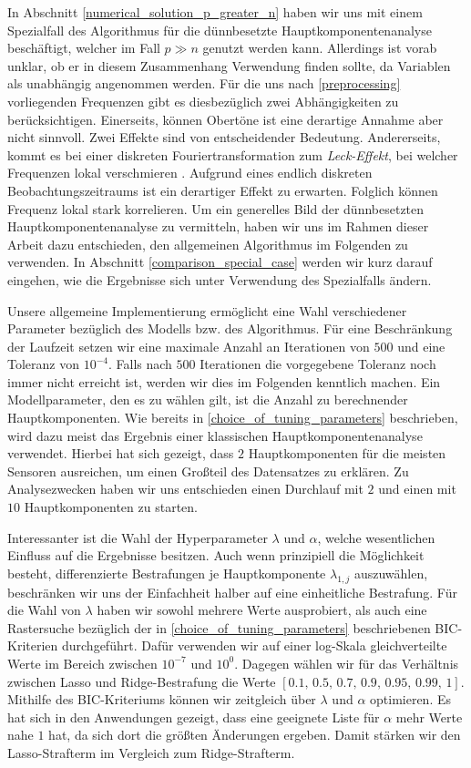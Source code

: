 In Abschnitt \ref{numerical_solution_p_greater_n} haben wir uns mit einem Spezialfall des Algorithmus für die dünnbesetzte Hauptkomponentenanalyse beschäftigt, welcher im Fall $p \gg n$ genutzt werden kann. Allerdings ist vorab unklar, ob er in diesem Zusammenhang Verwendung finden sollte, da Variablen als unabhängig angenommen werden. Für die uns nach \ref{preprocessing} vorliegenden Frequenzen gibt es diesbezüglich zwei Abhängigkeiten zu berücksichtigen. Einerseits, können Obertöne
ist eine derartige Annahme aber nicht sinnvoll. Zwei Effekte sind von entscheidender Bedeutung. Andererseits, kommt es bei einer diskreten Fouriertransformation zum \textit{Leck-Effekt}, bei welcher Frequenzen lokal verschmieren \cite{kiencke}. Aufgrund eines endlich diskreten Beobachtungszeitraums ist ein derartiger Effekt zu erwarten. Folglich können Frequenz lokal stark korrelieren. Um ein generelles Bild der dünnbesetzten Hauptkomponentenanalyse zu vermitteln, haben wir uns im Rahmen dieser Arbeit dazu entschieden, den allgemeinen Algorithmus im Folgenden zu verwenden. In Abschnitt \ref{comparison_special_case} werden wir kurz darauf eingehen, wie die Ergebnisse sich unter Verwendung des Spezialfalls ändern.

Unsere allgemeine Implementierung ermöglicht eine Wahl verschiedener Parameter bezüglich des Modells bzw. des Algorithmus. Für eine Beschränkung der Laufzeit setzen wir eine maximale Anzahl an Iterationen von $500$ und eine Toleranz von $10^{-4}$. Falls nach $500$ Iterationen die vorgegebene Toleranz noch immer nicht erreicht ist, werden wir dies im Folgenden kenntlich machen. Ein Modellparameter, den es zu wählen gilt, ist die Anzahl zu berechnender Hauptkomponenten. Wie bereits in \ref{choice_of_tuning_parameters} beschrieben, wird dazu meist das Ergebnis einer klassischen Hauptkomponentenanalyse verwendet. Hierbei hat sich gezeigt, dass $2$ Hauptkomponenten für die meisten Sensoren ausreichen, um einen Großteil des Datensatzes zu erklären. Zu Analysezwecken haben wir uns entschieden einen Durchlauf mit $2$ und einen mit $10$ Hauptkomponenten zu starten. 

Interessanter ist die Wahl der Hyperparameter $\lambda$ und $\alpha$, welche wesentlichen Einfluss auf die Ergebnisse besitzen. Auch wenn prinzipiell die Möglichkeit besteht, differenzierte Bestrafungen je Hauptkomponente $\lambda_{1,j}$ auszuwählen, beschränken wir uns der Einfachheit halber auf eine einheitliche Bestrafung. Für die Wahl von $\lambda$ haben wir sowohl mehrere Werte ausprobiert, als auch eine Rastersuche bezüglich der in \ref{choice_of_tuning_parameters} beschriebenen BIC-Kriterien durchgeführt. Dafür verwenden wir auf einer log-Skala gleichverteilte Werte im Bereich zwischen $10^{-7}$ und $10^0$. Dagegen wählen wir für das Verhältnis zwischen Lasso und Ridge-Bestrafung die Werte $[0.1,\, 0.5,\, 0.7,\, 0.9,\, 0.95,\, 0.99,\, 1]$. Mithilfe des BIC-Kriteriums können wir zeitgleich über $\lambda$ und $\alpha$ optimieren. Es hat sich in den Anwendungen gezeigt, dass eine geeignete Liste für $\alpha$ mehr Werte nahe $1$ hat, da sich dort die größten Änderungen ergeben. Damit stärken wir den Lasso-Strafterm im Vergleich zum Ridge-Strafterm.


